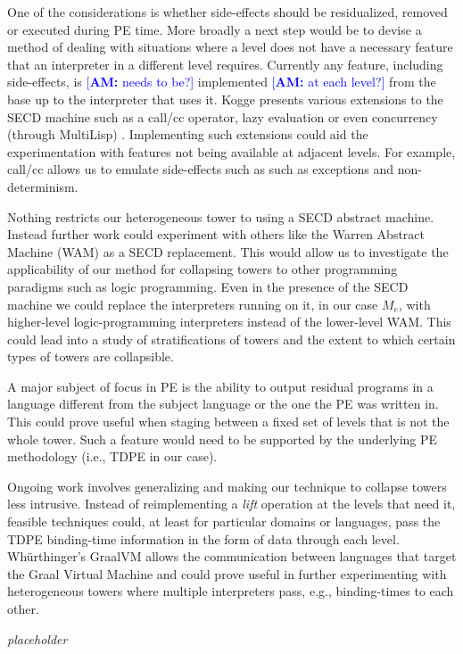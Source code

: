 \documentclass[sigplan,anonymous,review]{acmart}
\newcommand{\AMcomment}[1]{\textcolor{blue}{[\textbf{AM:} #1]}}
\newcommand{\mevl}{$M_{e}$}
\theoremstyle{definition}
\begin{document}
One of the considerations is whether side-effects should be residualized, removed or executed during PE time. More broadly a next step would be to devise a method of dealing with situations where a level does not have a necessary feature that an interpreter in a different level requires.
Currently any feature, including side-effects, is \AMcomment{needs to be?} implemented \AMcomment{at each level?} from the base up to the interpreter that uses it.
Kogge presents various extensions to the SECD machine such as a call/cc operator, lazy evaluation or even concurrency (through MultiLisp) \cite{kogge1990architecture}. Implementing such extensions could aid the experimentation with features not being available at adjacent levels. For example, call/cc allows us to emulate side-effects such as such as exceptions and non-determinism.

Nothing restricts our heterogeneous tower to using a SECD abstract machine. Instead further work could experiment with others like the Warren Abstract Machine (WAM) \cite{warren1983abstract} as a SECD replacement. This would allow us to investigate the applicability of our method for collapsing towers to other programming paradigms such as logic programming. Even in the presence of the SECD machine we could replace the interpreters running on it, in our case \mevl, with higher-level logic-programming interpreters instead of the lower-level WAM. This could lead into a study of stratifications of towers and the extent to which certain types of towers are collapsible.

A major subject of focus in PE is the ability to output residual programs in a language different from the subject language or the one the PE was written in. This could prove useful when staging between a fixed set of levels that is not the whole tower. Such a feature would need to be supported by the underlying PE methodology (i.e., TDPE in our case).

Ongoing work involves generalizing and making our technique to collapse towers less intrusive. Instead of reimplementing a \textit{lift} operation at the levels that need it, feasible techniques could, at least for particular domains or languages, pass the TDPE binding-time information in the form of data through each level. Wh{\"u}rthinger's GraalVM \cite{wurthinger2013one} allows the communication between languages that target the Graal Virtual Machine and could prove useful in further experimenting with heterogeneous towers where multiple interpreters pass, e.g., binding-times to each other.

\begin{acks}
\textit{placeholder}
\end{acks}




\end{document}
